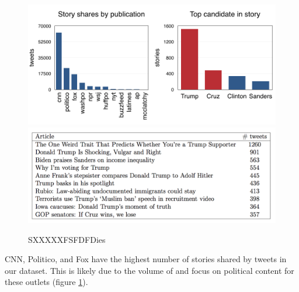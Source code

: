 \documentclass[letterpaper]{article}
\begin{document}
\begin{figure}[t!]
\centering 
  \includegraphics[width=\linewidth]{story-stats-horizontal}  
  \includegraphics[width=\linewidth]{top-10-stories}    
  \caption{SXXXXXFSFDFDies
    \label{fig:story-stats}}
\end{figure} 

 


CNN, Politico, and Fox have the highest number of stories shared by tweets in our dataset. This is likely due to the volume of and focus on political content for these outlets (figure \ref{fig:story-stats}).  

\end{document}
